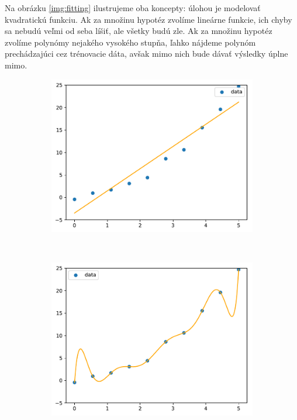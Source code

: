 Na obrázku \ref{img:fitting} ilustrujeme oba koncepty: úlohou je modelovať
kvadratickú funkciu. Ak za množinu hypotéz zvolíme lineárne funkcie,
ich chyby sa nebudú veľmi od seba líšiť, ale všetky budú zle. Ak za
množinu hypotéz zvolíme polynómy nejakého vysokého stupňa, ľahko
nájdeme polynóm prechádzajúci cez trénovacie dáta, avšak mimo nich
bude dávať výsledky úplne mimo.

\begin{figure}
  \centering
  \begin{subfigure}[b]{0.3\linewidth}
    \includegraphics[width=\linewidth]{obrazky/fitting1.pdf}
  \end{subfigure}
  ~
  \begin{subfigure}[b]{0.3\textwidth}
    \includegraphics[width=\linewidth]{obrazky/fitting9.pdf}

\end{subfigure}
\end{figure}
